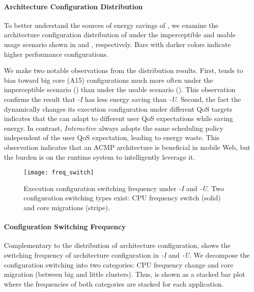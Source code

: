\paragraph{Architecture Configuration Distribution} To better understand the sources of energy savings of \ebs , we examine the architecture configuration distribution of \ebs under the imperceptible and usable usage scenario shown in  and , respectively. Bars with darker colors indicate higher performance configurations.

We make two notable observations from the distribution results. First, \ebs tends to bias toward big core (A15) configurations much more often under the imperceptible scenario () than under the usable scenario (). This observation confirms the result that \textit{\ebs-I} has less energy saving than \textit{\ebs-U}. Second, the fact the \ebs dynamically changes its execution configuration under different QoS targets indicates that the \ebs can adapt to different user QoS expectations while saving energy. In contrast, \textit{Interactive} always adopts the same scheduling policy independent of the user QoS expectation, leading to energy waste. This observation indicates that an ACMP architecture is beneficial in mobile Web, but the burden is on the runtime system to intelligently leverage it.

\begin{figure}[t]
  \centering
  \texttt{[image: freq\_switch]}
  \caption{Execution configuration switching frequency under \textit{\ebs-I} and \textit{\ebs-U}. Two configuration switching types exist: CPU frequency switch (solid) and core migrations (stripe).}
  \label{fig:freq_switch}
\end{figure}

\paragraph{Configuration Switching Frequency} Complementary to the distribution of architecture configuration,  shows the switching frequency of architecture configuration in \textit{\ebs-I} and \textit{\ebs-U}. We decompose the configuration switching into two categories: CPU frequency change and core migration (between big and little clusters). Thus,  is shown as a stacked bar plot where the frequencies of both categories are stacked for each application.

